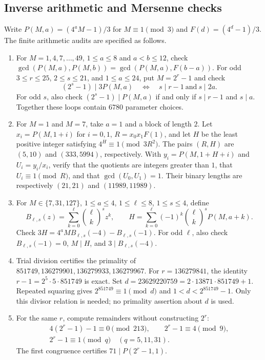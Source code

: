 \documentclass[11pt,a4paper]{article}
\theoremstyle{definition}
\theoremstyle{remark}
\numberwithin{equation}{section}
\begin{document}
\subsection{Inverse arithmetic and Mersenne checks}

Write $P(M,a)=(4^aM-1)/3$ for $M\equiv1\pmod3$ and
$F(d)=(4^d-1)/3$. The finite arithmetic audits are specified as follows.
\begin{enumerate}
\item For $M=1,4,7,\ldots,49$, $1\le a\le8$ and $a<b\le12$,
check
$\gcd(P(M,a),P(M,b))=\gcd(P(M,a),F(b-a))$.
For odd $3\le r\le25$, $2\le s\le21$, and $1\le a\le24$,
put $M=2^r-1$ and check
\[
 (2^s-1)\mid3P(M,a)
 \quad\Longleftrightarrow\quad s\mid r-1\ \text{and}\ s\mid2a.
\]
For odd $s$, also check
$(2^s-1)\mid P(M,a)$ if and only if $s\mid r-1$ and $s\mid a$.
Together these loops contain $6780$ parameter choices.
\item For $M=1$ and $M=7$, take $a=1$ and a block of length $2$.
Let $x_i=P(M,1+i)$ for $i=0,1$,
$R=x_0x_1F(1)$, and let $H$ be the least positive integer satisfying
$4^H\equiv1\pmod{3R^2}$. The pairs $(R,H)$ are $(5,10)$ and
$(333,5994)$, respectively. With $y_i=P(M,1+H+i)$ and $U_i=y_i/x_i$,
verify that the quotients are integers greater than $1$, that
$U_i\equiv1\pmod R$, and that $\gcd(U_0,U_1)=1$.
Their binary lengths are respectively $(21,21)$ and $(11989,11989)$.
\item For $M\in\{7,31,127\}$, $1\le a\le4$, $1\le \ell\le8$,
$1\le s\le4$, define
\[
 B_{\ell,s}(z)=\sum_{k=0}^{\ell}\binom\ell k^s z^k,
 \qquad H=\sum_{k=0}^{\ell}(-1)^k\binom\ell k^s P(M,a+k).
\]
Check $3H=4^aM B_{\ell,s}(-4)-B_{\ell,s}(-1)$.
For odd $\ell$, also check $B_{\ell,s}(-1)=0$, $M\mid H$, and
$3\mid B_{\ell,s}(-4)$.
\item Trial division certifies the primality of
$851749,136279901,136279933,136279967$.
For $r=136279841$, the identity $r-1=2^5\cdot5\cdot851749$ is exact.
Set $d=23629220759=2\cdot13871\cdot851749+1$.
Repeated squaring gives $2^{851749}\equiv1\pmod d$ and $1<d<2^{851749}-1$.
Only this divisor relation is needed; no primality assertion about $d$
is used.
\item For the same $r$, compute remainders without constructing $2^r$:
\[
\begin{gathered}
4(2^r-1)-1\equiv0\pmod{213},\qquad 2^r-1\equiv4\pmod9,\\
2^r-1\equiv1\pmod q\quad(q=5,11,31).
\end{gathered}
\]
The first congruence certifies $71\mid P(2^r-1,1)$.
\end{enumerate}
\end{document}
